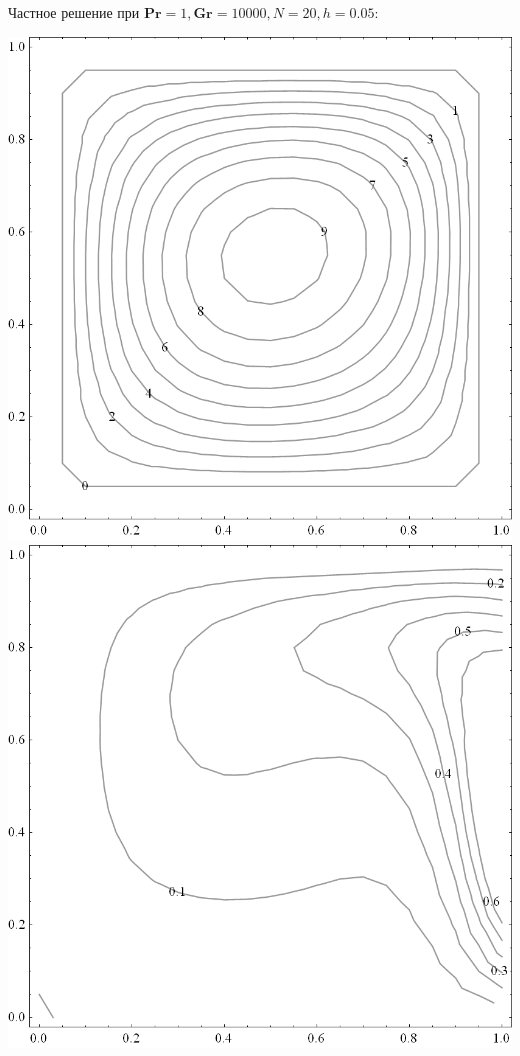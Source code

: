 \documentclass[a4paper, 12pt]{article}
\newcommand{\Pra}{\mathbf{Pr}}
\newcommand{\Gra}{\mathbf{Gr}}
\begin{document}
    \bigskip
    Частное решение при $\Pra = 1, \Gra = 10000, N = 20, h = 0.05$:
    \bigskip

    \includegraphics[scale=0.25]{images/psi_10k.png}
    \qquad
    \includegraphics[scale=0.25]{images/t_10k.png}
\end{document}
